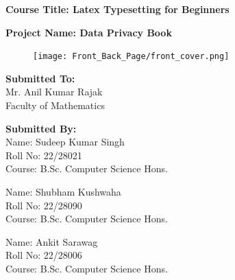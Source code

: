 \begin{titlepage}
    \vspace{2cm}

    {\Large \textbf{Course Title: Latex Typesetting for Beginners}} \\
    \vspace{0.5cm}
    
    {\Large \textbf{Project Name: Data Privacy Book}} \\
    \vspace{1.5cm}
    \begin{figure}[h!]
        \centering
        \texttt{[image: Front\_Back\_Page/front\_cover.png]}
    \end{figure}
    \vspace*{\fill}
    \begin{flushleft}
        {\large \textbf{Submitted To:}} \\
        \vspace{0.2cm}
        Mr. Anil Kumar Rajak \\
        Faculty of Mathematics \\
        \vspace{1cm}

        {\large \textbf{Submitted By:}} \\
        \vspace{1cm}
        Name: Sudeep Kumar Singh \\
        Roll No: 22/28021 \\
        Course: B.Sc. Computer Science Hons. \\
        \vspace{1cm}

        Name: Shubham Kushwaha \\
        Roll No: 22/28090 \\
        Course: B.Sc. Computer Science Hons. \\
        \vspace{1cm}

        Name: Ankit Sarawag \\
        Roll No: 22/28006 \\
        Course: B.Sc. Computer Science Hons.
    \end{flushleft}

    \vspace{1cm}
\end{titlepage}
